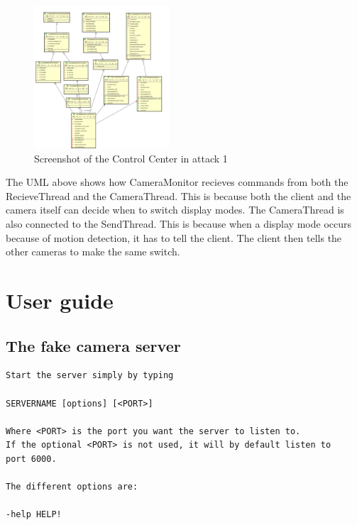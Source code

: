 \documentclass[8pt,titlepage]{article}
\begin{document}
\begin{figure}[hbp]
\includegraphics[width=0.45\textwidth]{../uml/server.png}
\caption{Screenshot of the Control Center in attack 1}
\end{figure}

The UML above shows how CameraMonitor recieves commands from both the RecieveThread and the CameraThread. This is because both the client and the camera itself can decide when to switch display modes. The CameraThread is also connected to the SendThread. This is because when a display mode occurs because of motion detection, it has to tell the client. The client then tells the other cameras to make the same switch.

\section{User guide}

\subsection{The fake camera server}
\begin{verbatim}
Start the server simply by typing 

SERVERNAME [options] [<PORT>]

Where <PORT> is the port you want the server to listen to. 
If the optional <PORT> is not used, it will by default listen to 
port 6000.

The different options are:

-help HELP!

\end{verbatim}
\end{document}
